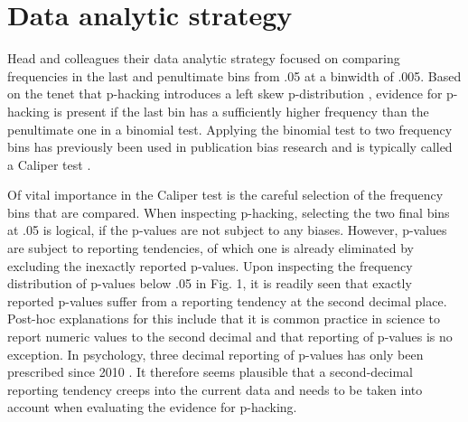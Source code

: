 \section*{Data analytic strategy}
Head and colleagues their data analytic strategy focused on comparing frequencies in the last and penultimate bins from .05 at a binwidth of .005. Based on the tenet that p-hacking introduces a left skew p-distribution \cite{Simonsohn2014}, evidence for p-hacking is present if the last bin has a sufficiently higher frequency than the penultimate one in a binomial test. Applying the binomial test to two frequency bins has previously been used in publication bias research and is typically called a Caliper test \cite{gerber2010, kuhberger2014}.

Of vital importance in the Caliper test is the careful selection of the frequency bins that are compared. When inspecting p-hacking, selecting the two final bins at .05 is logical, if the p-values are not subject to any biases. However, p-values are subject to reporting tendencies, of which one is already eliminated by excluding the inexactly reported p-values. Upon inspecting the frequency distribution of p-values below .05 in Fig. 1, it is readily seen that exactly reported p-values suffer from a reporting tendency at the second decimal place. Post-hoc explanations for this include that it is common practice in science to report numeric values to the second decimal and that reporting of p-values is no exception. In psychology, three decimal reporting of p-values has only been prescribed since 2010 \cite{AmericanPsychologicalAssociation2010}. It therefore seems plausible that a second-decimal reporting tendency creeps into the current data and needs to be taken into account when evaluating the evidence for p-hacking.